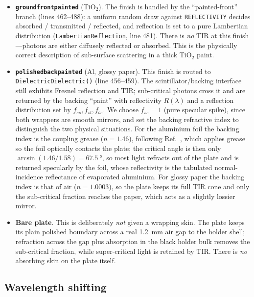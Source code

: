 \documentclass[11pt,a4paper]{article}
\begin{document}
\begin{itemize}
  \item \textbf{\texttt{groundfrontpainted}} (TiO$_2$). The finish is handled by
        the ``painted-front'' branch (lines 462--488): a uniform random draw
        against \texttt{REFLECTIVITY} decides absorbed / transmitted / reflected,
        and reflection is set to a pure Lambertian distribution
        (\texttt{LambertianReflection}, line 481). There is \emph{no} TIR at this
        finish---photons are either diffusely reflected or absorbed. This is the
        physically correct description of sub-surface scattering in a thick
        TiO$_2$ paint.
  \item \textbf{\texttt{polishedbackpainted}} (Al, glossy paper). This finish is
        routed to \texttt{DielectricDielectric()} (line 456--459). The
        scintillator/backing interface still exhibits Fresnel reflection and TIR;
        sub-critical photons cross it and are returned by the backing ``paint''
        with reflectivity $R(\lambda)$ and a reflection distribution set by
        $f_{ss}, f_{sl}, f_{bs}$. We choose $f_{ss} = 1$ (pure specular spike),
        since both wrappers are smooth mirrors, and set the backing refractive
        index to distinguish the two physical situations. For the aluminium foil
        the backing index is the coupling grease ($n = 1.46$), following
        Ref.~\cite{Rao2025}, which applies grease so the foil optically contacts
        the plate; the critical angle is then only
        $\arcsin(1.46/1.58) = \SI{67.5}{\degree}$, so most light refracts out of
        the plate and is returned specularly by the foil, whose reflectivity is
        the tabulated normal-incidence reflectance of evaporated aluminium. For
        glossy paper the backing index is that of air ($n = 1.0003$), so the
        plate keeps its full TIR cone and only the sub-critical fraction reaches
        the paper, which acts as a slightly lossier mirror.
  \item \textbf{Bare plate}. This is deliberately \emph{not} given a wrapping
        skin. The plate keeps its plain polished boundary across a real
        \SI{1.2}{\milli\meter} air gap to the holder shell; refraction across the
        gap plus absorption in the black holder bulk removes the sub-critical
        fraction, while super-critical light is retained by TIR. There is
        \emph{no} absorbing skin on the plate itself.
\end{itemize}

\subsection{Wavelength shifting}
\label{sec:wlphysics}
\end{document}
